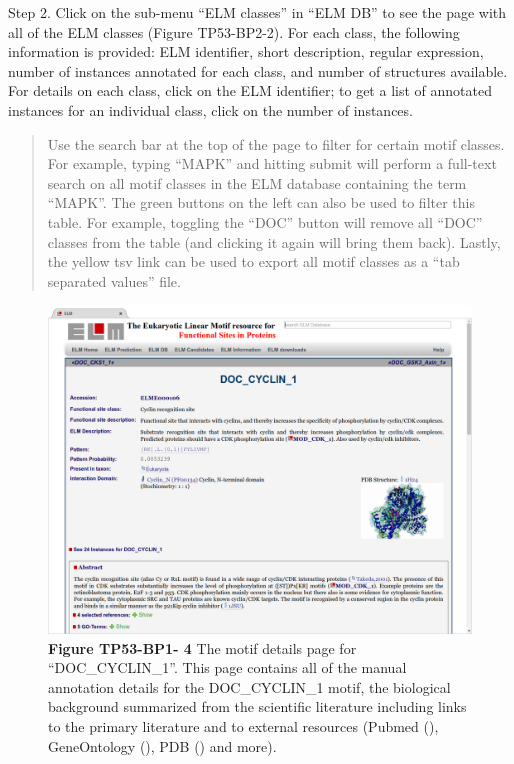 Step 2. Click on the sub-menu ``ELM classes'' in ``ELM DB'' to see the
page with all of the ELM classes (Figure TP53-BP2-2). For each class,
the following information is provided: ELM identifier, short
description, regular expression, number of instances annotated for each
class, and number of structures available. For details on each class,
click on the ELM identifier; to get a list of annotated instances for an
individual class, click on the number of instances.

\begin{quote}
Use the search bar at the top of the page to filter for certain motif
classes. For example, typing ``MAPK'' and hitting submit will perform a
full-text search on all motif classes in the ELM database containing the
term ``MAPK''. The green buttons on the left can also be used to filter
this table. For example, toggling the ``DOC'' button will remove all
``DOC'' classes from the table (and clicking it again will bring them
back). Lastly, the yellow tsv link can be used to export all motif
classes as a ``tab separated values'' file.
\end{quote}

\begin{figure}[h!]
\centering
\includegraphics[width=\textwidth]{Figures/TP53_1/doc_cyclin_1_class.png}
\caption{
\textbf{Figure TP53-BP1- 4} The motif details page for
``DOC\_CYCLIN\_1''. This page contains all of the manual annotation
details for the DOC\_CYCLIN\_1 motif, the biological background
summarized from the scientific literature including links to the primary
literature and to external resources (Pubmed (\cite{27899561}),
GeneOntology (\cite{27899567}), PDB (\cite{12037327}) and more).
}
\end{figure}

